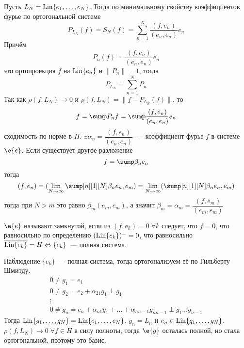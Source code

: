 \documentclass[14pt]{extarticle}
\begin{document}
\begin{Proof}
    Пусть $L_N = \operatorname{Lin}\{e_1,\dots, e_N\}$.
    Тогда по минимальному свойству коэффициентов фурье по ортогональной системе
    $$
    P_{L_N}(f) = S_N(f) = \sum\limits_{n = 1}^N\dfrac{(f, e_n)}{(e_n, e_n)}e_n
    $$
    Причём
    $$
    P_n(f) = \dfrac{(f, e_n)}{(e_n, e_n)}e_n
    $$
    это ортопроекция $f$  на $\operatorname{Lin}\{e_n\}$ и $\|P_n\| = 1$, тогда
    $$
    P_{L_N} = \sum\limits_{n = 1}^N P_n
    $$
    Так как $\rho(f, L_N) \to 0$ и $\rho(f, L_N) = \|f - P_{L_N}(f)\|$, то
    $$
    f = \sump P_nf = \sump \dfrac{(f, e_n)}{(e_n, e_n)}e_n
    $$
    сходимость по норме в $H$.
    $\exists \alpha_n = \dfrac{(f, e_n)}{(e_n, e_n)}$~--- коэффициент фурье $f$ в системе
    $\e{e}$.
    Если существует другое разложение
    $$
    f = \sump \beta_n e_n
    $$
    тогда
    $$
    (f, e_n) = (\lim_{N \to \infty} \sump[n][1][N] \beta_n e_n, e_m) = \lim_{N \to \infty}
    ( \sump[n][1][N] \beta_n e_n, e_m)
    $$
    тогда при $N > m$ это равно $\beta_m (e_m, e_m)$, а значит $\beta_m = \alpha_m =
    \dfrac{(f, e_m)}{(e_m, e_m)}$
\end{Proof}
\begin{Opr}
    $\e{e}$ называют замкнутой, если из $(f, e_k) = 0\; \forall k$ следует, что $f = 0$, что
    равносильно по определению $(\operatorname{Lin}\{e_k\})^\perp = 0$, что равносильно 
    $\overline{\operatorname{Lin}\{e_k\}} = H \Leftrightarrow \{e_k\}$~--- полная система.
\end{Opr}
\begin{MathCl}{Наблюдение}
    $\{e_k\}$~--- полная система, тогда ортогонализуем её по Гильберту-Шмитду.
    \begin{gather*}
        0 \ne g_1 = e_1\\
        0 \ne g_2 = e_2 + \alpha_{21}g_1 \perp g_1\\
        \vdots\\
        0 \ne g_n = e_n + \alpha_{n1}g_1 + \dots + \alpha_{n n-1}g_{nn - 1} \perp g_1 \dots g_
        {n - 1}
    \end{gather*}
    Тогда $\operatorname{Lin}\{g_1,\dots, g_N\} = \operatorname{Lin}\{e_1,\dots, e_N\}$, $g_n = L_n$ и $e_n \in \operatorname{Lin}\{g_1,\dots, g_N\}$.
    $\rho(f, L_N) \to 0\;\forall f \in H$ в силу полноты, тогда $\e{g}$ осталась полной, но 
    стала ортогональной, поэтому это базис.
\end{MathCl}
\end{document}
